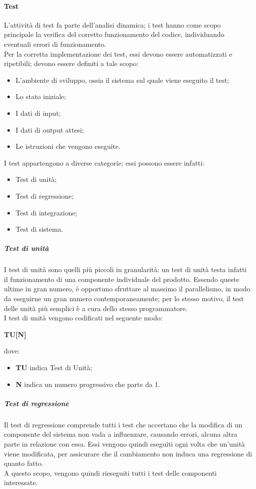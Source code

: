 \documentclass[../norme-di-progetto.tex]{subfiles}
\begin{document}
\paragraph{Test}
L'attività di test fa parte dell'analisi dinamica; i test hanno come scopo principale la verifica del corretto funzionamento del codice, individuando eventuali errori di funzionamento. \\
Per la corretta implementazione dei test, essi devono essere automatizzati e ripetibili; devono essere definiti a tale scopo:
\begin{itemize}
  \item L'ambiente di sviluppo, ossia il sistema sul quale viene eseguito il test;
  \item Lo stato iniziale;
  \item I dati di input;
  \item I dati di output attesi;
  \item Le istruzioni che vengono eseguite.
\end{itemize}
I test appartengono a diverse categorie; essi possono essere infatti:
\begin{itemize}
  \item Test di unità;
  \item Test di regressione;
  \item Test di integrazione;
  \item Test di sistema.
\end{itemize}

\subparagraph*{Test di unità}
I test di unità sono quelli più piccoli in granularità: un test di unità testa infatti il funzionamento di una componente individuale del prodotto. Essendo queste ultime in gran numero, è opportuno sfruttare al massimo il parallelismo, in modo da eseguirne un gran numero contemporaneamente; per lo stesso motivo, il test delle unità più semplici è a cura dello stesso programmatore. \\
I test di unità vengono codificati nel seguente modo:
\begin{center}
  \centering
  \textbf{TU[N]}
\end{center} dove:
\begin{itemize}
  \item \textbf{TU} indica Test di Unità;
  \item \textbf{N} indica un numero progressivo che parte da 1.
\end{itemize}

\subparagraph*{Test di regressione}
Il test di regressione comprende tutti i test che accertano che la modifica di un componente del sistema non vada a influenzare, causando errori, alcuna altra parte in relazione con essa. Essi vengono quindi eseguiti ogni volta che un'unità viene modificata, per assicurare che il cambiamento non induca una regressione di quanto fatto. \\
A questo scopo, vengono quindi rieseguiti tutti i test delle componenti interessate.
\end{document}
